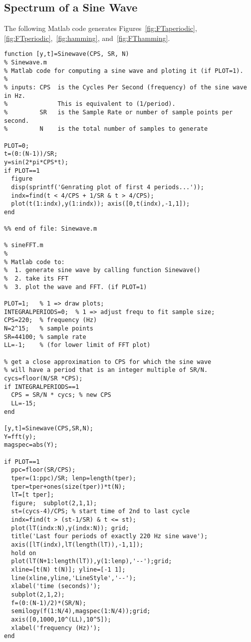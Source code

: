 \subsection{Spectrum of a Sine Wave}\label{sec:Sinewave}
The following Matlab code generates Figures~\ref{fig:FTaperiodic},
\ref{fig:FTperiodic},~\ref{fig:hamming}, and~\ref{fig:FThamming}.
\begin{verbatim}
function [y,t]=Sinewave(CPS, SR, N)
% Sinewave.m
% Matlab code for computing a sine wave and ploting it (if PLOT=1).
%
% inputs: CPS  is the Cycles Per Second (frequency) of the sine wave in Hz.
%              This is equivalent to (1/period).
%         SR   is the Sample Rate or number of sample points per second.
%         N    is the total number of samples to generate

PLOT=0;
t=(0:(N-1))/SR;
y=sin(2*pi*CPS*t);
if PLOT==1
  figure
  disp(sprintf('Genrating plot of first 4 periods...'));
  indx=find(t < 4/CPS + 1/SR & t > 4/CPS);
  plot(t(1:indx),y(1:indx)); axis([0,t(indx),-1,1]);
end

%% end of file: Sinewave.m

% sineFFT.m
%
% Matlab code to:
%  1. generate sine wave by calling function Sinewave() 
%  2. take its FFT 
%  3. plot the wave and FFT. (if PLOT=1)

PLOT=1;   % 1 => draw plots;
INTEGRALPERIODS=0;  % 1 => adjust frequ to fit sample size;
CPS=220;  % frequency (Hz)
N=2^15;   % sample points
SR=44100; % sample rate
LL=-1;    % (for lower limit of FFT plot)

% get a close approximation to CPS for which the sine wave 
% will have a period that is an integer multiple of SR/N.
cycs=floor(N/SR *CPS);  
if INTEGRALPERIODS==1
  CPS = SR/N * cycs; % new CPS
  LL=-15;
end

[y,t]=Sinewave(CPS,SR,N);
Y=fft(y);
magspec=abs(Y);

if PLOT==1
  ppc=floor(SR/CPS);
  tper=(1:ppc)/SR; lenp=length(tper);
  tper=tper+ones(size(tper))*t(N);
  lT=[t tper];
  figure;  subplot(2,1,1);
  st=(cycs-4)/CPS; % start time of 2nd to last cycle
  indx=find(t > (st-1/SR) & t <= st);
  plot(lT(indx:N),y(indx:N)); grid;
  title('Last four periods of exactly 220 Hz sine wave');
  axis([lT(indx),lT(length(lT)),-1,1]);
  hold on
  plot(lT(N+1:length(lT)),y(1:lenp),'--');grid;
  xline=[t(N) t(N)]; yline=[-1 1];
  line(xline,yline,'LineStyle','--');
  xlabel('time (seconds)');
  subplot(2,1,2);
  f=(0:(N-1)/2)*(SR/N);
  semilogy(f(1:N/4),magspec(1:N/4));grid;
  axis([0,1000,10^(LL),10^5]);
  xlabel('frequency (Hz)');
end


\end{verbatim}
